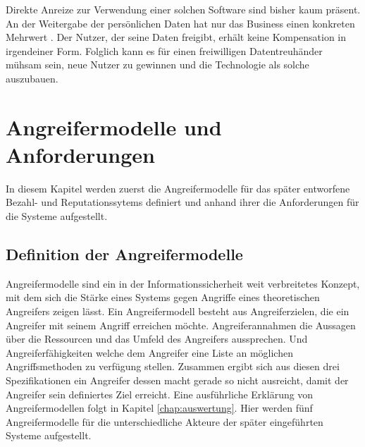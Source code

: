 \documentclass{scrreprt}
\begin{document}
Direkte Anreize zur Verwendung einer solchen Software sind bisher kaum präsent. An der Weitergabe der persönlichen Daten hat nur das Business einen konkreten Mehrwert . Der Nutzer, der seine Daten freigibt, erhält keine Kompensation in irgendeiner Form. Folglich kann es für einen freiwilligen Datentreuhänder mühsam sein, neue Nutzer zu gewinnen und die Technologie als solche auszubauen.




\chapter{Angreifermodelle und Anforderungen}
In diesem Kapitel werden zuerst die Angreifermodelle für das später entworfene Bezahl- und Reputationssytems definiert und anhand ihrer die Anforderungen für die Systeme aufgestellt.
\label{chap:req}
\section{Definition der Angreifermodelle}
Angreifermodelle sind ein in der Informationssicherheit weit verbreitetes Konzept, mit dem sich die Stärke eines Systems gegen Angriffe eines theoretischen Angreifers zeigen lässt. Ein Angreifermodell besteht aus Angreiferzielen, die ein Angreifer mit seinem Angriff erreichen möchte. Angreiferannahmen die Aussagen über die Ressourcen und das Umfeld des Angreifers aussprechen. Und Angreiferfähigkeiten welche dem Angreifer eine Liste an möglichen Angriffsmethoden zu verfügung stellen. Zusammen ergibt sich aus diesen drei Spezifikationen ein Angreifer dessen macht gerade so nicht ausreicht, damit der Angreifer sein definiertes Ziel erreicht. Eine ausführliche Erklärung von Angreifermodellen folgt in Kapitel \ref{chap:auswertung}. Hier werden fünf Angreifermodelle für die unterschiedliche Akteure der später eingeführten Systeme aufgestellt.\\
\end{document}
